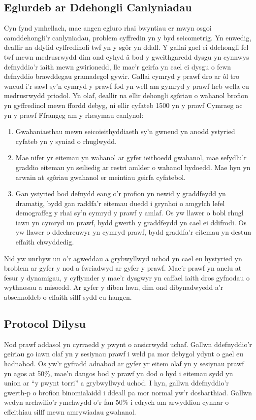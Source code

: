 \subsection{Eglurdeb ar Ddehongli Canlyniadau}
Cyn fynd ymhellach, mae angen egluro rhai bwyntiau er mwyn osgoi camddehongli'r canlyniadau, problem cyffredin yn y byd seicometrig. Yn enwedig, deallir na ddylid cyffredinoli twf yn y sgôr yn ddall. Y gallai gael ei ddehongli fel twf mewn medrusrwydd dim ond cyhyd â bod y gweithgaredd dysgu yn cynnwys defnyddio'r iaith mewn gwirionedd, lle mae'r geirfa yn cael ei dysgu o fewn defnyddio brawddegau gramadegol gywir. Gallai cymryd y prawf dro ar ôl tro wneud i'r sawl sy'n cymryd y prawf fod yn well am gymryd y prawf heb wella eu medrusrwydd priodol. Yn olaf, deallir na ellir dehongli sgôriau o wahanol brofion yn gyffredinol mewn ffordd debyg, ni ellir cyfateb 1500 yn y prawf Cymraeg ac yn y prawf Ffrangeg am y rhesymau canlynol:
\begin{enumerate}
  \item Gwahaniaethau mewn seicoieithyddiaeth sy'n gwneud yn anodd ystyried cyfateb yn y syniad o rhuglwydd.
  \item Mae nifer yr eitemau yn wahanol ar gyfer ieithoedd gwahanol, mae sefydlu'r graddio eitemau yn seiliedig ar restri amlder o wahanol hydoedd. Mae hyn yn arwain at sgôriau gwahanol er meintiau geirfa cyfatebol.
  \item Gan ystyried bod defnydd eang o'r profion yn newid y graddfeydd yn dramatig, bydd gan raddfa'r eitemau duedd i grynhoi o amgylch lefel demograffeg y rhai sy'n cymryd y prawf y amlaf. Os yw llawer o bobl rhugl iawn yn cymryd un prawf, bydd gwerth y graddfeydd yn cael ei ddifrodi. Os yw llawer o ddechreuwyr yn cymryd prawf, bydd graddfa'r eitemau yn destun effaith chwyddedig.
\end{enumerate}

Nid yw unrhyw un o'r agweddau a grybwyllwyd uchod yn cael eu hystyried yn broblem ar gyfer y nod a fwriadwyd ar gyfer y prawf. Mae'r prawf yn anelu at fesur y dynamigau, y cyflymder y mae'r dysgwyr yn caffael iaith dros gyfnodau o wythnosau a misoedd. Ar gyfer y diben hwn, dim ond dibynadwyedd a'r absennoldeb o effaith silff sydd eu hangen.

\subsection{Protocol Dilysu}
Nod prawf addasol yn cyrraedd y pwynt o ansicrwydd uchaf. Gallwn ddefnyddio'r geiriau go iawn olaf yn y sesiynau prawf i weld pa mor debygol ydynt o gael eu hadnabod. Os yw'r gyfradd adnabod ar gyfer yr eitem olaf yn y sesiynau prawf yn agos at 50\%, mae'n dangos bod y prawf yn dod o hyd i eitemau sydd yn union ar ``y pwynt torri'' a grybwyllwyd uchod. I hyn, gallwn ddefnyddio'r gwerth-p o brofion binomialaidd i ddeall pa mor normal yw'r dosbarthiad. Gallwn wedyn archwilio'r ymchwydd o'r fan 50\% i edrych am arwyddion cynnar o effeithiau silff mewn amrywiadau gwahanol.
